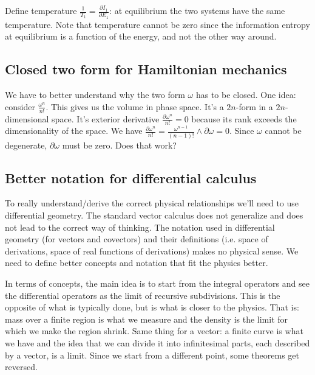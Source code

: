 \documentclass[11pt,letterpaper,fleqn]{memoir} %
\begin{document}
Define temperature $\frac{1}{T_1} = \frac{\partial I_1}{\partial E_1}$: at equilibrium the two systems have the same temperature. Note that temperature cannot be zero since the information entropy at equilibrium is a function of the energy, and not the other way around.

\subsection{Closed two form for Hamiltonian mechanics}

We have to better understand why the two form $\omega$ has to be closed. One idea: consider $\frac{\omega^n}{n!}$. This gives us the volume in phase space. It's a $2n$-form in a $2n$-dimensional space. It's exterior derivative $\frac{\partial\omega^n}{n!}=0$ because its rank exceeds the dimensionality of the space. We have $\frac{\partial\omega^n}{n!}=\frac{\omega^{n-1}}{(n-1)!}\wedge\partial\omega=0$. Since $\omega$ cannot be degenerate, $\partial \omega$ must be zero. Does that work?

\subsection{Better notation for differential calculus}

To really understand/derive the correct physical relationships we'll need to use differential geometry. The standard vector calculus does not generalize and does not lead to the correct way of thinking. The notation used in differential geometry (for vectors and covectors) and their definitions (i.e. space of derivations, space of real functions of derivations) makes no physical sense. We need to define better concepts and notation that fit the physics better.

In terms of concepts, the main idea is to start from the integral operators and see the differential operators as the limit of recursive subdivisions. This is the opposite of what is typically done, but is what is closer to the physics. That is: mass over a finite region is what we measure and the density is the limit for which we make the region shrink. Same thing for a vector: a finite curve is what we have and the idea that we can divide it into infinitesimal parts, each described by a vector, is a limit. Since we start from a different point, some theorems get reversed.
\end{document}
